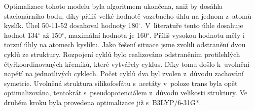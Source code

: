 \documentclass[
digital, %
table,   %
lof,     %
lot,     %
oneside,
]{fithesis3}
\begin{document}
Optimalizace tohoto modelu byla algoritmem ukončena, aniž by dosáhla stacionárního bodu, díky příliš velké hodnotě vazebného úhlu na jednom z~atomů kyslík. Úhel 50-11-52 dosahoval hodnoty 180$^\circ$. V~literatuře tento úhle dosahuje hodnot 134$^\circ$ až 150$^\circ$, maximální hodnota je 160$^\circ$\cite{yuan2003si}. Příliš vysokou hodnotu měly i torzní úhly na atomech kyslíku. %
Jako řešení situace jsme zvolili odstranění dvou cyklů ze struktury. Rozpojení cyklů bylo realizováno odstraněním protilehlých čtyřkoordinovaných křemíků, které vytvářely cyklus. Díky tomu došlo k~uvolnění napětí na jednotlivých cyklech. Počet cyklů dva byl zvolen z~důvodu zachování symetrie. Uvolněná struktura silikofosfátu s~acetáty v~poloze trans byla opět optimalizována, tentokrát s~pseudopotenciálem z~důvodu velikosti struktury. Ve druhém kroku byla provedena optimalizace již s~B3LYP/6-31G*.\\
\end{document}
